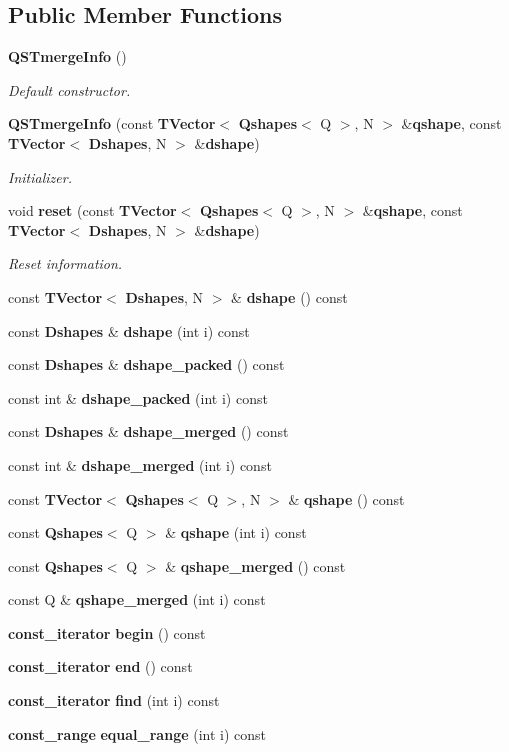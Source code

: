 \subsection*{Public Member Functions}
\begin{DoxyCompactItemize}
\item 
{\bf Q\-S\-Tmerge\-Info} ()
\begin{DoxyCompactList}\small\item\em Default constructor. \end{DoxyCompactList}\item 
{\bf Q\-S\-Tmerge\-Info} (const {\bf T\-Vector}$<$ {\bf Qshapes}$<$ Q $>$, N $>$ \&{\bf qshape}, const {\bf T\-Vector}$<$ {\bf Dshapes}, N $>$ \&{\bf dshape})
\begin{DoxyCompactList}\small\item\em Initializer. \end{DoxyCompactList}\item 
void {\bf reset} (const {\bf T\-Vector}$<$ {\bf Qshapes}$<$ Q $>$, N $>$ \&{\bf qshape}, const {\bf T\-Vector}$<$ {\bf Dshapes}, N $>$ \&{\bf dshape})
\begin{DoxyCompactList}\small\item\em Reset information. \end{DoxyCompactList}\item 
const {\bf T\-Vector}$<$ {\bf Dshapes}, N $>$ \& {\bf dshape} () const 
\item 
const {\bf Dshapes} \& {\bf dshape} (int i) const 
\item 
const {\bf Dshapes} \& {\bf dshape\-\_\-packed} () const 
\item 
const int \& {\bf dshape\-\_\-packed} (int i) const 
\item 
const {\bf Dshapes} \& {\bf dshape\-\_\-merged} () const 
\item 
const int \& {\bf dshape\-\_\-merged} (int i) const 
\item 
const {\bf T\-Vector}$<$ {\bf Qshapes}$<$ Q $>$, N $>$ \& {\bf qshape} () const 
\item 
const {\bf Qshapes}$<$ Q $>$ \& {\bf qshape} (int i) const 
\item 
const {\bf Qshapes}$<$ Q $>$ \& {\bf qshape\-\_\-merged} () const 
\item 
const Q \& {\bf qshape\-\_\-merged} (int i) const 
\item 
{\bf const\-\_\-iterator} {\bf begin} () const 
\item 
{\bf const\-\_\-iterator} {\bf end} () const 
\item 
{\bf const\-\_\-iterator} {\bf find} (int i) const 
\item 
{\bf const\-\_\-range} {\bf equal\-\_\-range} (int i) const 
\end{DoxyCompactItemize}
